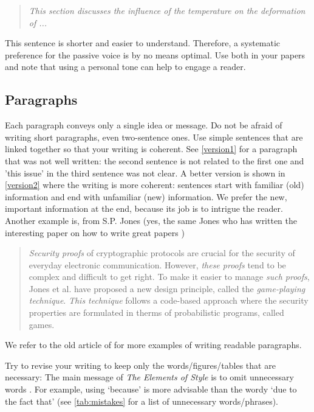 \documentclass[authoryear,12pta4paper,fleqn]{article}
\numberwithin{equation}{section}
\theoremstyle{remark}
\begin{document}
\begin{quote}
\textit{This section discusses the influence of the temperature on the deformation of ...}
\end{quote}
This sentence is shorter and easier to understand. Therefore, a systematic preference for the passive voice is by no means optimal. Use both in your papers and note that using a personal tone can help to engage a reader. 

\subsection{Paragraphs}\label{sec:paragraph}

Each paragraph conveys only a single idea or message. Do not be afraid of writing short paragraphs, even two-sentence ones. 
Use simple sentences that are linked together so that your writing is coherent. 
See \cref{version1} for a paragraph that was not well written: the second sentence is not related to the first one and 'this issue' in the third sentence was not clear. A better version is shown in \cref{version2} where the writing is more coherent: sentences start with familiar (old) information and end with unfamiliar (new) information. We prefer the new, important information at the end, because its job is to intrigue the reader. Another example is, from S.P. Jones (yes, the same Jones who has written the interesting paper on how to write great papers \citep{Jones})


\begin{quote}
\textit{Security proofs} of cryptographic protocols are crucial for the security of everyday electronic communication. However, \textit{these proofs} tend to be complex and difficult to get right. To make it easier to manage \textit{such proofs}, Jones et al. have proposed a new design principle, called the \textit{game-playing technique}. 
\textit{This technique} follows a code-based approach where the security properties are formulated in therms of probabilistic programs, called games.
\end{quote} 
We refer to the old article of \cite{gopen1990science} for more examples of writing readable paragraphs.

Try to revise your writing to keep only the words/figures/tables that are necessary: The main message of \textit{The Elements of Style} is to omit unnecessary words \citep{white1972elements}. For example, using `because' is more advisable than the wordy `due to the fact that' (see \cref{tab:mistakes} for a list of unnecessary words/phrases).\\
\end{document}
